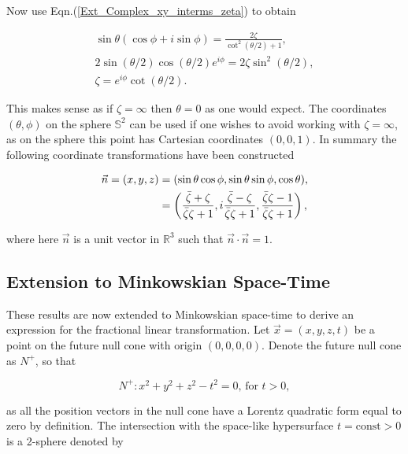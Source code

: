 \noindent Now use Eqn.(\ref{Ext_Complex_xy_interms_zeta}) to obtain

\begin{gather*}
\sin{\theta}(\cos{\phi} +i \sin{\phi}) = \frac{2\zeta}{\cot^2{\left(\theta/2\right)} + 1 }, \\
2\sin{\left(\theta/2\right)}\cos{\left(\theta/2\right)}e^{i\phi} = 2\zeta \sin^2{\left(\theta/2\right)}, \\
\zeta = e^{i\phi}\cot{\left(\theta/2\right)}. 
\end{gather*}

\noindent This makes sense as if $\zeta = \infty$ then $\theta = 0$ as one would expect. The coordinates $(\theta, \phi)$ on the sphere $\mathbb{S}^2$ can be used if one wishes to avoid working with $\zeta = \infty$, as on the sphere this point has Cartesian coordinates $(0,0,1)$. In summary the following coordinate transformations have been constructed

\begin{align}
\vec{n} = (x, y, z) & = (\sin{\theta}\cos{\phi}, \sin{\theta}\sin{\phi}, \cos{\theta}), \\ \label{Ext_Complex_Vec_n}
&
\begin{Huge}
                     = \left( \frac{\bar{\zeta} + \zeta}{\bar{\zeta}\zeta + 1}  ,i\frac{\bar{\zeta} - \zeta}{\bar{\zeta}\zeta + 1}, \frac{\bar{\zeta}\zeta - 1}{\bar{\zeta}\zeta + 1}  \right),
\end{Huge}
\end{align}

\noindent where here $\vec{n}$ is a unit vector in $\mathbb{R}^3$ such that $\vec{n} \cdot \vec{n} = 1$.

\subsection{Extension to Minkowskian Space-Time}\label{Fractional_Section_Extension_to_Minkowskian}

These results are now extended to Minkowskian space-time to derive an expression for the fractional linear transformation. Let $\vec{x} = (x,y,z,t)$ be a point on the future null cone with origin $(0,0,0,0)$. Denote the future null cone as $N^{+}$, so that 

\begin{equation*}
N^+ : x^2 + y^2 + z^2 - t^2 = 0 \text{,  for  } t>0,
\end{equation*}

\noindent as all the position vectors in the null cone have a Lorentz quadratic form equal to zero by definition. The intersection with the space-like hypersurface $t = \text{const}>0$ is a 2-sphere denoted by 

